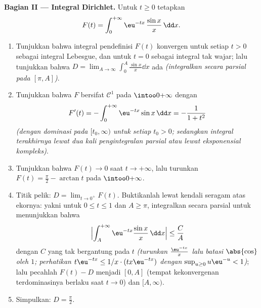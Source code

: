 \begin{problem}
\medskip
\noindent\textbf{Bagian II --- Integral Dirichlet.} Untuk $t
\geq 0$ tetapkan
\[
F(t) = \int_0^{+\infty}\eu^{-tx}\,\frac{\sin x}{x}\,\dd x .
\]
\begin{enumerate}[resume]
  \item Tunjukkan bahwa integral pendefinisi $F(t)$ konvergen untuk
        setiap $t > 0$ sebagai integral Lebesgue, dan untuk $t = 0$
        sebagai integral tak wajar; lalu tunjukkan bahwa $D =
        \lim_{A\to\infty}\int_0^A\frac{\sin x}x\dd x$ ada
        \emph{(integralkan secara parsial pada $[\pi, A]$)}.
  \item Tunjukkan bahwa $F$ bersifat $\mathcal C^1$ pada
        $\intoo0{+\infty}$ dengan
        \[
        F'(t) = -\int_0^{+\infty}\eu^{-tx}\sin x\,\dd x
        = -\frac{1}{1 + t^2}
        \]
        \emph{(dengan dominasi pada $[t_0, \infty)$ untuk setiap $t_0 >
        0$; sedangkan integral terakhirnya lewat dua kali pengintegralan parsial atau
        lewat eksponensial kompleks)}.
  \item Tunjukkan bahwa $F(t) \to 0$ saat $t \to +\infty$, lalu turunkan $F(t)
        = \frac\pi2 - \arctan t$ pada $\intoo0{+\infty}$.
  \item Titik pelik: $D = \lim_{t\to0^+}F(t)$. Buktikanlah
        lewat kendali seragam atas ekornya: yakni untuk $0 \leq t \leq 1$
        dan $A \geq \pi$, integralkan secara parsial untuk menunjukkan bahwa
        \[
        \Bigl|\int_A^{+\infty}\eu^{-tx}\frac{\sin
        x}x\,\dd x\Bigr| \leq \frac{C}{A}
        \]
        dengan $C$ yang tak bergantung pada $t$ \emph{(turunkan
        $\frac{\eu^{-tx}}x$ lalu batasi $\abs{\cos}$ oleh $1$;
        perhatikan $t\eu^{-tx} \leq 1/x\cdot(tx\eu^{-tx})$ dengan
        $\sup_{u\geq0}u\eu^{-u} < 1$)}; lalu pecahlah $F(t) - D$
        menjadi $[0, A]$ (tempat kekonvergenan terdominasinya berlaku saat $t \to 0$) dan
        $[A, \infty)$.
  \item Simpulkan: $D = \frac\pi2$.
\end{enumerate}


\end{problem}
